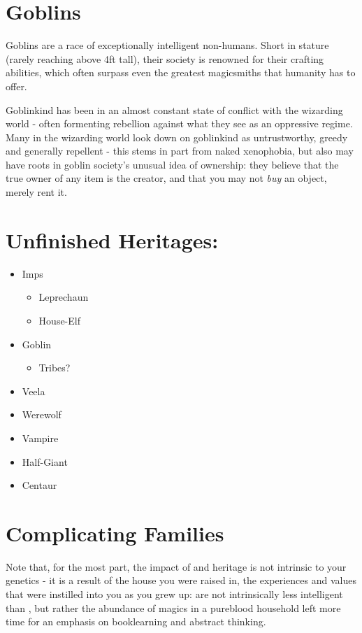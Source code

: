  
\section{Goblins}

Goblins are a race of exceptionally intelligent non-humans. Short in stature (rarely reaching above 4ft tall), their society is renowned for their crafting abilities, which often surpass even the greatest magicsmiths that humanity has to offer. 

Goblinkind has been in an almost constant state of conflict with the wizarding world - often formenting rebellion against what they see as an oppressive regime. Many in the wizarding world look down on goblinkind as untrustworthy, greedy and generally repellent - this stems in part from naked xenophobia, but also may have roots in goblin society's unusual idea of ownership: they believe that the true owner of any item is the creator, and that you may not {\it buy} an object, merely rent it. 

\section{Unfinished Heritages:}

\begin{itemize}

	\item Imps
	\begin{itemize}
		\item Leprechaun
		\item House-Elf
	\end{itemize}
	\item Goblin
	\begin{itemize}
		\item Tribes?
	\end{itemize}
	\item Veela
	\item Werewolf
	\item Vampire
	\item Half-Giant
	\item Centaur
\end{itemize}

\section{Complicating Families}

Note that, for the most part, the impact of  and heritage is not intrinsic to your genetics - it is a result of the house you were raised in, the experiences and values that were instilled into you as you grew up:  are not intrinsically less intelligent than , but rather the abundance of magics in a pureblood household left more time for an emphasis on booklearning and abstract thinking. 


